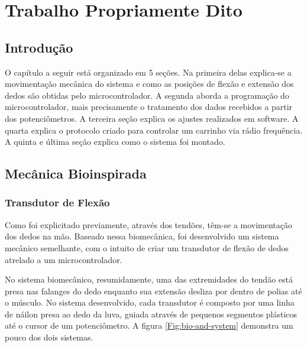 \documentclass[
	12pt,				%
	openright,			%
	oneside,			%
	a4paper,			%
	english,			%
	brazil				%
	]{abntex2}
\begin{document}
%
%
	
	\chapter{Trabalho Propriamente Dito}

		\section{Introdução}
		
		O capítulo a seguir está organizado em 5 seções. Na primeira delas explica-se a movimentação mecânica do sistema e como as posições de flexão e extensão dos dedos são obtidas pelo microcontrolador. A segunda aborda a programação do microcontrolador, mais precisamente o tratamento dos dados recebidos a partir dos potenciômetros. A terceira seção explica os ajustes realizados em software. A quarta explica o protocolo criado para controlar um carrinho via rádio frequência. A quinta e última seção explica como o sistema foi montado.



		\section{Mecânica Bioinspirada}

			\subsection{Transdutor de Flexão}

		Como foi explicitado previamente, através dos tendões, têm-se a movimentação dos dedos na mão. Baseado nessa biomecânica, foi desenvolvido um sistema mecânico semelhante, com o intuito de criar um transdutor de flexão de dedos atrelado a um microcontrolador. 

		No sistema biomecânico, resumidamente, uma das extremidades do tendão está presa nas falanges do dedo enquanto sua extensão desliza por dentro de polias até o músculo. No sistema desenvolvido, cada transdutor é composto por uma linha de náilon presa ao dedo da luva, guiada através de pequenos segmentos plásticos até o cursor de um potenciômetro. A figura \ref{Fig:bio-and-system} demonstra um pouco dos dois sistemas.
\end{document}
